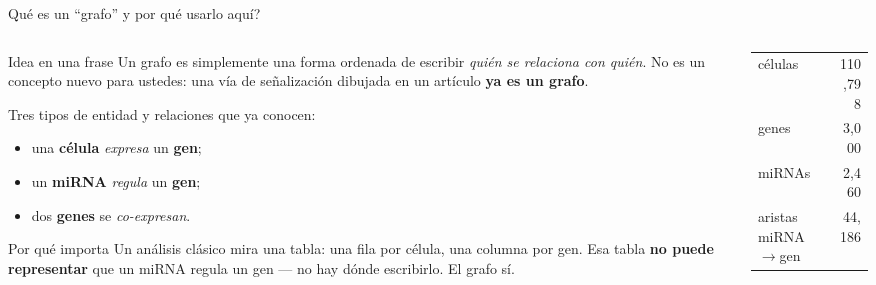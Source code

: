 \begin{frame}{\textquestiondown{}Qu\'e es un ``grafo'' y por qu\'e usarlo aqu\'i?}
  \begin{columns}[T]
    \begin{column}{0.54\textwidth}
      \begin{block}{Idea en una frase}
        \small
        Un grafo es simplemente una forma ordenada de escribir \emph{qui\'en se relaciona con qui\'en}. No es un concepto nuevo para ustedes: una v\'ia de se\~nalizaci\'on dibujada en un art\'iculo \textbf{ya es un grafo}.
      \end{block}

      \small
      Tres tipos de entidad y relaciones que ya conocen:
      \begin{itemize}
        \item una \textbf{c\'elula} \emph{expresa} un \textbf{gen};
        \item un \textbf{miRNA} \emph{regula} un \textbf{gen};
        \item dos \textbf{genes} se \emph{co-expresan}.
      \end{itemize}

      \vspace{0.3em}
      \begin{block}{Por qu\'e importa}
        \scriptsize
        Un an\'alisis cl\'asico mira una tabla: una fila por c\'elula, una columna por gen. Esa tabla \textbf{no puede representar} que un miRNA regula un gen --- no hay d\'onde escribirlo. El grafo s\'i.
      \end{block}
    \end{column}
    \begin{column}{0.44\textwidth}
      \centering

      \vspace{0.6em}
      \scriptsize
      \begin{tabular}{lr}
        \toprule
        c\'elulas & 110,798 \\
        genes & 3,000 \\
        miRNAs & 2,460 \\
        \midrule
        aristas miRNA$\to$gen & 44,186 \\
        \bottomrule
      \end{tabular}
    \end{column}
  \end{columns}
\end{frame}


